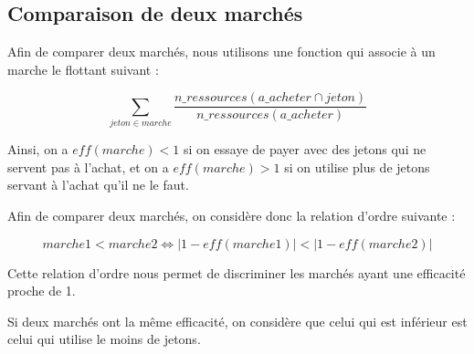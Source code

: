 \subsection{Comparaison de deux marchés}

\label{market_cmp}

Afin de comparer deux marchés, nous utilisons une fonction  qui associe à un marche le flottant suivant : 

$$\sum_{jeton \in marche} \frac {n\_ressources(a\_acheter \cap jeton)} {n\_ressources(a\_acheter)}$$

Ainsi, on a $eff(marche) < 1$ si on essaye de payer avec des jetons qui ne servent pas à l'achat, et on a $eff(marche) > 1$ si on utilise plus de jetons servant à l'achat qu'il ne le faut.

Afin de comparer deux marchés, on considère donc la relation d'ordre suivante : 

$$marche1 < marche2 \Leftrightarrow |1 - eff(marche1)| < |1 - eff(marche2)|$$

Cette relation d'ordre nous permet de discriminer les marchés ayant une efficacité proche de 1.

\begin{summary}
Si deux marchés ont la même efficacité, on considère que celui qui est inférieur est celui qui utilise le moins de jetons.
\end{summary}
